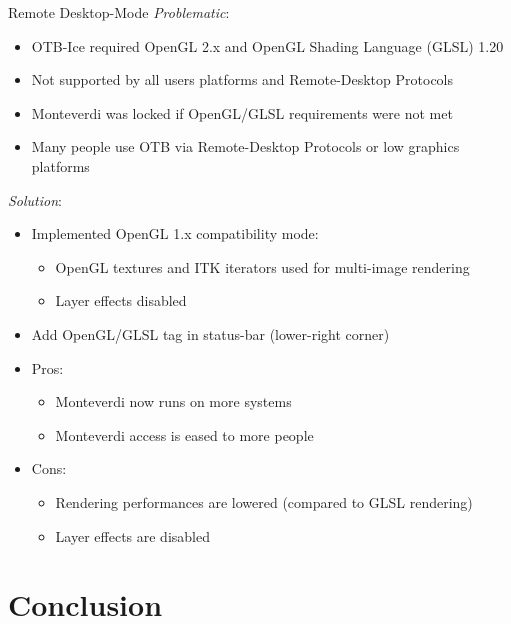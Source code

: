 \documentclass[smaller]{beamer}
\begin{document}
\begin{frame}{Remote Desktop-Mode}   
\textit{Problematic}:
\begin{itemize}  
   \item OTB-Ice required OpenGL 2.x and OpenGL Shading Language (GLSL) 1.20
   \item Not supported by all users platforms and Remote-Desktop Protocols
   \item Monteverdi was locked if OpenGL/GLSL requirements were not met
   \item Many people use OTB via Remote-Desktop Protocols or low graphics platforms
\end{itemize} 

\textit{Solution}:
\begin{itemize}  
   \item Implemented OpenGL 1.x compatibility mode:
   \begin{itemize} 
     \item OpenGL textures and ITK iterators used for multi-image rendering
     \item Layer effects disabled
   \end{itemize}   
   \item Add OpenGL/GLSL tag in status-bar (lower-right corner)
   \item  Pros:
   \begin{itemize} 
     \item Monteverdi now runs on more systems
     \item Monteverdi access is eased to more people
   \end{itemize}  
   \item Cons:
   \begin{itemize} 
     \item Rendering performances are lowered (compared to GLSL rendering)
     \item Layer effects are disabled
   \end{itemize} 
\end{itemize} 

\end{frame} 

\section{Conclusion}
\end{document}
